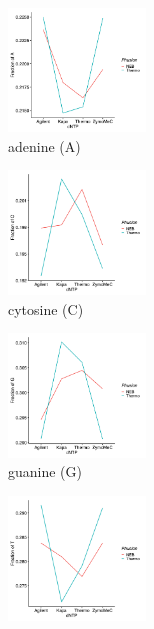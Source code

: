\documentclass[parskip=full, numbers=noenddot]{scrreprt}
\begin{document}
\begin{figure}[htpb]
  \centering
  \begin{subfigure}[htpb]{0.4\textwidth}
    \centering
    \includegraphics[width=0.4\textwidth]{linearmodel_a}
    \caption{adenine (A)}
    \label{fig:linearmodel_a}
  \end{subfigure}
  \begin{subfigure}[htpb]{0.4\textwidth}
    \centering
    \includegraphics[width=0.4\textwidth]{linearmodel_c}
    \caption{cytosine (C)}
    \label{fig:linearmodel_c}
  \end{subfigure}
  \begin{subfigure}[htpb]{0.4\textwidth}
    \centering
    \includegraphics[width=0.4\textwidth]{linearmodel_g}
    \caption{guanine (G)}
    \label{fig:linearmodel_g}
  \end{subfigure}
  \begin{subfigure}[htpb]{0.4\textwidth}
    \centering
    \includegraphics[width=0.4\textwidth]{linearmodel_t}

\end{subfigure}
\end{figure}
\end{document}
